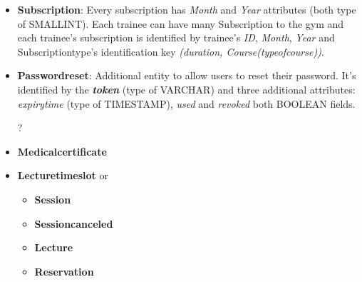 \begin{itemize}
    	\item \textbf{Subscription}: Every subscription has \textit{Month} and \textit{Year} attributes (both type of SMALLINT). Each trainee can have many Subscription to the gym and each trainee's subscription is identified by trainee's \textit{ID}, \textit{Month}, \textit{Year} and Subscription\textunderscore type's identification key \textit{(duration, Course(type\textunderscore of\textunderscore course))}.
    	
    	\item \textbf{Password\textunderscore reset}: Additional entity to allow users to reset their password. It's identified by the \textbf{\textit{token}} (type of VARCHAR) and three additional attributes: \textit{expiry\textunderscore time} (type of TIMESTAMP), \textit{used} and \textit{revoked} both BOOLEAN fields.
    	
    	\color{red}
    	\item[?]
    	\item \textbf{Medical\textunderscore certificate}
    	
    	\item \textbf{Lecture\textunderscore time\textunderscore slot} or
		\begin{itemize}
    	    \item \textbf{Session}
		    \item \textbf{Session\textunderscore canceled}
		    \item \textbf{Lecture}
		    \item \textbf{Reservation}
    	\end{itemize}
		\color{black}
	
    \end{itemize}